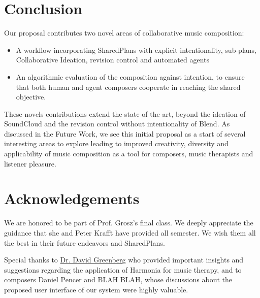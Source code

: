 \documentclass[final,authoryear,5p,times,twocolumn]{elsarticle}
\begin{document}
\section*{Conclusion}
  
Our proposal contributes two novel areas of collaborative music composition:
\begin{itemize}
	\item A workflow incorporating SharedPlans with explicit intentionality, sub-plans, Collaborative Ideation, revision control and automated agents
	\item An algorithmic evaluation of the composition against intention, to ensure that both human and agent composers cooperate in reaching the shared objective.
\end{itemize}


These novels contributions extend the state of the art, beyond the ideation of SoundCloud and the revision control without intentionality of Blend. As discussed in the Future Work, we see this initial proposal as a start of several interesting areas to explore leading to improved creativity, diversity and applicability of music composition as a tool for composers, music therapists and listener pleasure.
 
 
\section*{Acknowledgements}

We are honored to be part of Prof. Grosz's final class. We deeply appreciate the guidance that she and Peter Krafft have provided all semester. We wish them all the best in their future endeavors and SharedPlans.

Special thanks to \href{https://www.psychologytoday.com/experts/david-m-greenberg-phd}{Dr. David Greenberg} who provided important insights and suggestions regarding the application of Harmonia for music therapy, and to composers Daniel Pencer and BLAH BLAH, whose discussions about the proposed user interface of our system were highly valuable.






\end{document}
